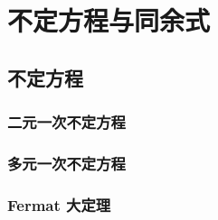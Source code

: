\chapter{不定方程与同余式}
\section{不定方程}
\subsection{二元一次不定方程}
\clearpage
\subsection{多元一次不定方程}
\clearpage
\subsection{Fermat 大定理}
\clearpage
